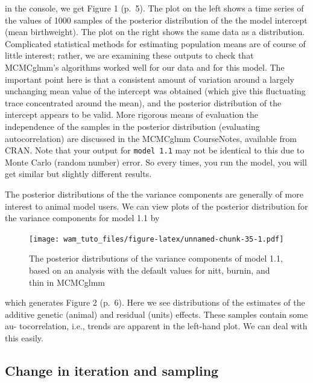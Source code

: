\documentclass[
  12pt,
]{book}
\newenvironment{Shaded}{\begin{snugshade}}{\end{snugshade}}
\newcommand{\FloatTok}[1]{\textcolor[rgb]{0.00,0.00,0.81}{#1}}
\newcommand{\FunctionTok}[1]{\textcolor[rgb]{0.00,0.00,0.00}{#1}}
\newcommand{\NormalTok}[1]{#1}
\newcommand{\SpecialCharTok}[1]{\textcolor[rgb]{0.00,0.00,0.00}{#1}}
\begin{document}
in the console, we get Figure 1 (p.~5). The plot on the left shows a time series of the values of 1000 samples of the posterior distribution of the the model intercept (mean birthweight). The plot on the right shows the same data as a distribution. Complicated statistical methods for estimating population means are of course of little interest; rather, we are examining these outputs to check that MCMCglmm's algorithms worked well for our data and for this model. The important point here is that a consistent amount of variation around a largely unchanging mean value of the intercept was obtained (which give this fluctuating trace concentrated around the mean), and the posterior distribution of the intercept appears to be valid. More rigorous means of evaluation the independence of the samples in the posterior distribution (evaluating autocorrelation) are discussed in the MCMCglmm CourseNotes, available from CRAN. Note that your output for \texttt{model\ 1.1} may not be identical to this due to Monte Carlo (random number) error. So every times, you run the model, you will get similar but slightly different results.

The posterior distributions of the the variance components are generally of more interest to animal model users. We can view plots of the posterior distribution for the variance components for model 1.1 by

\begin{Shaded}
\end{Shaded}

\begin{figure}
\centering
\texttt{[image: wam\_tuto\_files/figure-latex/unnamed-chunk-35-1.pdf]}
\caption{\label{fig:unnamed-chunk-35}The posterior distributions of the variance components of model 1.1, based on an analysis with the default values for nitt, burnin, and thin in MCMCglmm}
\end{figure}

which generates Figure 2 (p.~6). Here we see distributions of the estimates of the additive genetic (animal) and residual (units) effects. These samples contain some au- tocorrelation, i.e., trends are apparent in the left-hand plot. We can deal with this easily.

\hypertarget{change-in-iteration-and-sampling}{%
\subsection{Change in iteration and sampling}\label{change-in-iteration-and-sampling}}
\end{document}
